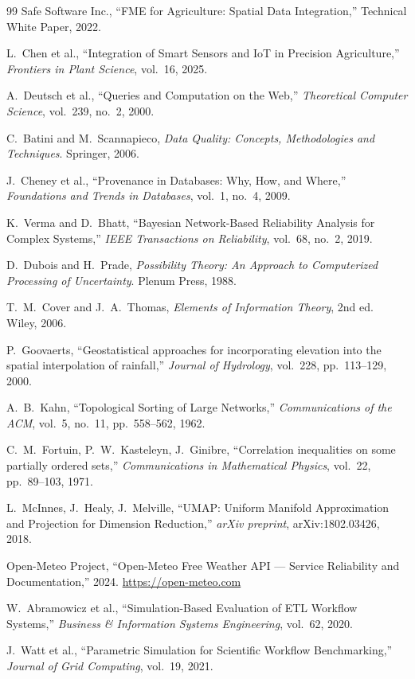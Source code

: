 \documentclass[12pt,a4paper]{article}
\theoremstyle{plain}
\theoremstyle{definition}
\theoremstyle{remark}
\begin{document}
\begin{thebibliography}{99}
		Safe Software Inc.,
		``FME for Agriculture: Spatial Data Integration,''
		Technical White Paper, 2022.
		
		L.~Chen et al.,
		``Integration of Smart Sensors and IoT in Precision Agriculture,''
		\textit{Frontiers in Plant Science}, vol.~16, 2025.
		
		A.~Deutsch et al.,
		``Queries and Computation on the Web,''
		\textit{Theoretical Computer Science}, vol.~239, no.~2, 2000.
		
		C.~Batini and M.~Scannapieco,
		\textit{Data Quality: Concepts, Methodologies and Techniques}.
		Springer, 2006.
		
		J.~Cheney et al.,
		``Provenance in Databases: Why, How, and Where,''
		\textit{Foundations and Trends in Databases}, vol.~1, no.~4, 2009.
		
		K.~Verma and D.~Bhatt,
		``Bayesian Network-Based Reliability Analysis for Complex Systems,''
		\textit{IEEE Transactions on Reliability}, vol.~68, no.~2, 2019.
		
		D.~Dubois and H.~Prade,
		\textit{Possibility Theory: An Approach to Computerized Processing
			of Uncertainty}. Plenum Press, 1988.
		
		T.~M.~Cover and J.~A.~Thomas,
		\textit{Elements of Information Theory}, 2nd ed. Wiley, 2006.
		
		P.~Goovaerts,
		``Geostatistical approaches for incorporating elevation into the spatial
		interpolation of rainfall,''
		\textit{Journal of Hydrology}, vol.~228, pp.~113--129, 2000.
		
		A.~B.~Kahn,
		``Topological Sorting of Large Networks,''
		\textit{Communications of the ACM}, vol.~5, no.~11, pp.~558--562, 1962.
		
		C.~M.~Fortuin, P.~W.~Kasteleyn, J.~Ginibre,
		``Correlation inequalities on some partially ordered sets,''
		\textit{Communications in Mathematical Physics}, vol.~22,
		pp.~89--103, 1971.
		
		L.~McInnes, J.~Healy, J.~Melville,
		``UMAP: Uniform Manifold Approximation and Projection for Dimension
		Reduction,'' \textit{arXiv preprint}, arXiv:1802.03426, 2018.
		
		
		Open-Meteo Project,
		``Open-Meteo Free Weather API --- Service Reliability and Documentation,''
		2024. \url{https://open-meteo.com}
		
		W.~Abramowicz et al.,
		``Simulation-Based Evaluation of ETL Workflow Systems,''
		\textit{Business \& Information Systems Engineering}, vol.~62, 2020.
		
		J.~Watt et al.,
		``Parametric Simulation for Scientific Workflow Benchmarking,''
		\textit{Journal of Grid Computing}, vol.~19, 2021.
		
	\end{thebibliography}
	
\end{document}
